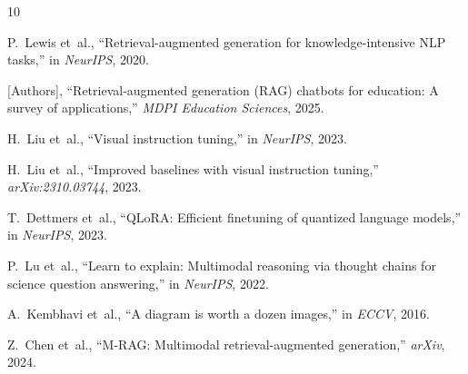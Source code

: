 \documentclass[conference]{IEEEtran}
\begin{document}
\begin{thebibliography}{10}

P.~Lewis et~al., ``Retrieval-augmented generation for knowledge-intensive NLP tasks,'' in \emph{NeurIPS}, 2020.

[Authors], ``Retrieval-augmented generation (RAG) chatbots for education: A survey of applications,'' \emph{MDPI Education Sciences}, 2025.

H.~Liu et~al., ``Visual instruction tuning,'' in \emph{NeurIPS}, 2023.

H.~Liu et~al., ``Improved baselines with visual instruction tuning,'' \emph{arXiv:2310.03744}, 2023.

T.~Dettmers et~al., ``QLoRA: Efficient finetuning of quantized language models,'' in \emph{NeurIPS}, 2023.

P.~Lu et~al., ``Learn to explain: Multimodal reasoning via thought chains for science question answering,'' in \emph{NeurIPS}, 2022.

A.~Kembhavi et~al., ``A diagram is worth a dozen images,'' in \emph{ECCV}, 2016.

Z.~Chen et~al., ``M-RAG: Multimodal retrieval-augmented generation,'' \emph{arXiv}, 2024.

\end{thebibliography}
\end{document}
